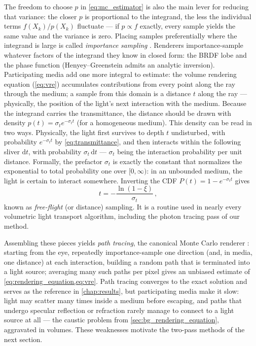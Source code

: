 The freedom to choose $p$ in \cref{eq:mc_estimator} is also the main lever for reducing that variance: the closer $p$ is proportional to the integrand, the less the individual terms $f(X_k)/p(X_k)$ fluctuate --- if $p \propto f$ exactly, every sample yields the same value and the variance is zero. Placing samples preferentially where the integrand is large is called \emph{importance sampling} \cite{veach97}. Renderers importance-sample whatever factors of the integrand they know in closed form: the BRDF lobe and the phase function (Henyey--Greenstein admits an analytic inversion). Participating media add one more integral to estimate: the volume rendering equation (\cref{eq:vre}) accumulates contributions from every point along the ray through the medium; a sample from this domain is a distance $t$ along the ray --- physically, the position of the light's next interaction with the medium. Because the integrand carries the transmittance, the distance should be drawn with density $p(t) = \sigma_t e^{-\sigma_t t}$ (for a homogeneous medium). This density can be read in two ways. Physically, the light first survives to depth $t$ undisturbed, with probability $e^{-\sigma_t t}$ by \cref{eq:transmittance}, and then interacts within the following sliver $\mathrm{d}t$, with probability $\sigma_t \,\mathrm{d}t$ --- $\sigma_t$ being the interaction probability per unit distance. Formally, the prefactor $\sigma_t$ is exactly the constant that normalizes the exponential to total probability one over $[0, \infty)$: in an unbounded medium, the light is certain to interact somewhere. Inverting the CDF $P(t) = 1 - e^{-\sigma_t t}$ gives
\begin{equation}
	\label{eq:free_flight}
	t = -\frac{\ln(1 - \xi)}{\sigma_t} \,,
\end{equation}
known as \emph{free-flight} (or distance) sampling. It is a routine used in nearly every volumetric light transport algorithm, including the photon tracing pass of our method.

Assembling these pieces yields \emph{path tracing}, the canonical Monte Carlo renderer \cite{kajiya86}: starting from the eye, repeatedly importance-sample one direction (and, in media, one distance) at each interaction, building a random path that is terminated into a light source; averaging many such paths per pixel gives an unbiased estimate of \cref{eq:rendering_equation,eq:vre}. Path tracing converges to the exact solution and serves as the reference in \cref{chap:results}, but participating media make it slow: light may scatter many times inside a medium before escaping, and paths that undergo specular reflection or refraction rarely manage to connect to a light source at all --- the caustic problem from \cref{sec:bg_rendering_equation}, aggravated in volumes. These weaknesses motivate the two-pass methods of the next section.

